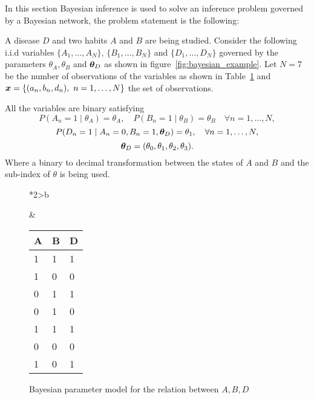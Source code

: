 In this section Bayesian inference is used to solve an inference problem governed by a Bayesian network, the problem statement is the following:

A disease \(D\) and two habits \(A\) and \(B\) are being studied.  Consider the following i.i.d variables \(\{A_{1},\dots, A_{N}\}\), \(\{B_{1},\dots,B_{N}\}\) and \(\{D_{1},\dots, D_{N}\}\) governed by the parameters \(\theta_{A}, \theta_{B}\) and \(\btheta_{D}\) as shown in figure~\ref{fig:bayesian_example}. Let \(N = 7\) be the number of observations of the variables as shown in Table~\ref{tab:bn_ex} and \( \bm{x} = \{(a_n, b_n, d_n),\ n=1,\dots,N\} \) the set of observations.

All the variables are binary satisfying
\[
  P(A_{n} = 1 \mid \theta_{A}) = \theta_{A}, \quad P(B_{n} = 1 \mid \theta_{B}) = \theta_{B} \quad \forall n=1,\dots,N,
\]
\[
  P(D_{n} = 1 \mid A_{n} = 0, B_{n} = 1, \bm{\theta}_{D}) = \theta_{1}, \quad \forall n = 1,\dots,N,
\]
\[
  \bm{\theta}_{D} = ( \theta_{0}, \theta_{1}, \theta_{2},\theta_{3}).
\]
Where a binary to decimal transformation between the states of \(A\) and \(B\) and the sub-index of \(\theta\) is being used.

\begin{figure}[!ht]
  \begin{tabular}{*{2}{>{\centering\arraybackslash}b{}}}
  \centering
  \begin{tikzpicture}[
    node distance=1cm and 0.5cm,
    mynode/.style={draw,circle,text width=0.5cm,align=center}
    ]

    \node[mynode] (d) {\(D_{n}\)};
    \node[mynode, above left=of d] (a) {\(A_{n}\)};
    \node[mynode, above right=of d] (b) {\(B_{n}\)};
    \node[mynode, above=of a] (ta) {\(\theta_{A}\)};
    \node[mynode, above=of b] (tb) {\(\theta_{B}\)};
    \node[mynode, below=of d] (td) {\(\btheta_{D}\)};
    \plate[inner sep=.3cm,xshift=.02cm,yshift=.2cm]  {} {(d)(a)(b)} {\(n= 1\dots N\)}; %
    \path (a) edge[-latex] (d)
    (b) edge[-latex] (d)
    (ta) edge[-latex] (a)
    (tb) edge[-latex] (b)
    (td) edge[-latex] (d)
    ;

  \end{tikzpicture}
    \caption{Bayesian parameter model for the relation between \(A,B,D\)}\label{fig:bayesian_example}
    &
      \renewcommand{\arraystretch}{1.3}
      \begin{tabular}{|l|l|l|}
    \hline
    A & B & D \\ \hline
    1 & 1 & 1 \\ \hline
    1 & 0 & 0 \\ \hline
    0 & 1 & 1 \\ \hline
    0 & 1 & 0 \\ \hline
    1 & 1 & 1 \\ \hline
    0 & 0 & 0 \\ \hline
    1 & 0 & 1 \\ \hline
  \end{tabular}\label{tab:bn_ex}
\end{tabular}
\end{figure}

